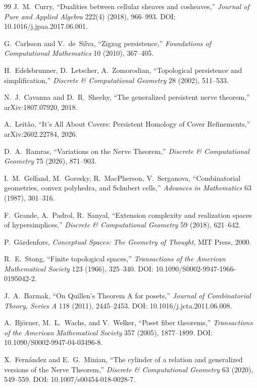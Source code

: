 \documentclass[11pt]{article}
\begin{document}
\begin{thebibliography}{99}
J.~M.~Curry,
``Dualities between cellular sheaves and cosheaves,''
\emph{Journal of Pure and Applied Algebra} 222(4) (2018), 966--993.
DOI: 10.1016/j.jpaa.2017.06.001.

G.~Carlsson and V.~de~Silva,
``Zigzag persistence,''
\emph{Foundations of Computational Mathematics} 10 (2010), 367--405.

H.~Edelsbrunner, D.~Letscher, A.~Zomorodian,
``Topological persistence and simplification,''
\emph{Discrete \& Computational Geometry} 28 (2002), 511--533.

N.~J.~Cavanna and D.~R.~Sheehy,
``The generalized persistent nerve theorem,''
arXiv:1807.07920, 2018.

A.~Leit\~ao,
``It's All About Covers: Persistent Homology of Cover Refinements,''
arXiv:2602.22784, 2026.

D.~A.~Ramras,
``Variations on the Nerve Theorem,''
\emph{Discrete \& Computational Geometry} 75 (2026), 871--903.

I.~M.~Gelfand, M.~Goresky, R.~MacPherson, V.~Serganova,
``Combinatorial geometries, convex polyhedra, and Schubert cells,''
\emph{Advances in Mathematics} 63 (1987), 301--316.

F.~Grande, A.~Padrol, R.~Sanyal,
``Extension complexity and realization spaces of hyper\-simplices,''
\emph{Discrete \& Computational Geometry} 59 (2018), 621--642.

P.~G\"ardenfors,
\emph{Conceptual Spaces: The Geometry of Thought},
MIT Press, 2000.


R.~E.~Stong,
``Finite topological spaces,''
\emph{Transactions of the American Mathematical Society} 123 (1966), 325--340.
DOI: 10.1090/S0002-9947-1966-0195042-2.

J.~A.~Barmak,
``On Quillen's Theorem A for posets,''
\emph{Journal of Combinatorial Theory, Series A} 118 (2011), 2445--2453.
DOI: 10.1016/j.jcta.2011.06.008.

A.~Bj\"orner, M.~L.~Wachs, and V.~Welker,
``Poset fiber theorems,''
\emph{Transactions of the American Mathematical Society} 357 (2005), 1877--1899.
DOI: 10.1090/S0002-9947-04-03496-8.

X.~Fern\'andez and E.~G.~Minian,
``The cylinder of a relation and generalized versions of the Nerve Theorem,''
\emph{Discrete \& Computational Geometry} 63 (2020), 549--559.
DOI: 10.1007/s00454-018-0028-7.


\end{thebibliography}
\end{document}
